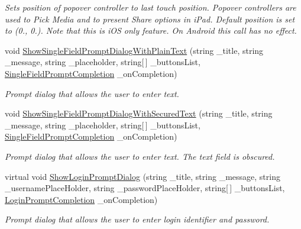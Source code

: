 \begin{DoxyCompactItemize}
\begin{DoxyCompactList}\small\item\em Sets position of popover controller to last touch position. Popover controllers are used to Pick Media and to present Share options in i\+Pad. Default position is set to (0., 0.). Note that this is i\+O\+S only feature. On Android this call has no effect. \end{DoxyCompactList}\item 
void \hyperlink{class_voxel_busters_1_1_native_plugins_1_1_u_i_ad78010ddfdb7303a095989f561dd895f}{Show\+Single\+Field\+Prompt\+Dialog\+With\+Plain\+Text} (string \+\_\+title, string \+\_\+message, string \+\_\+placeholder, string\mbox{[}$\,$\mbox{]} \+\_\+buttons\+List, \hyperlink{class_voxel_busters_1_1_native_plugins_1_1_u_i_ab0a0d009b7dbdc669cedc932da72e0ea}{Single\+Field\+Prompt\+Completion} \+\_\+on\+Completion)
\begin{DoxyCompactList}\small\item\em Prompt dialog that allows the user to enter text. \end{DoxyCompactList}\item 
void \hyperlink{class_voxel_busters_1_1_native_plugins_1_1_u_i_ad8376c30acf9b24dc8c4209a8b093b36}{Show\+Single\+Field\+Prompt\+Dialog\+With\+Secured\+Text} (string \+\_\+title, string \+\_\+message, string \+\_\+placeholder, string\mbox{[}$\,$\mbox{]} \+\_\+buttons\+List, \hyperlink{class_voxel_busters_1_1_native_plugins_1_1_u_i_ab0a0d009b7dbdc669cedc932da72e0ea}{Single\+Field\+Prompt\+Completion} \+\_\+on\+Completion)
\begin{DoxyCompactList}\small\item\em Prompt dialog that allows the user to enter text. The text field is obscured. \end{DoxyCompactList}\item 
virtual void \hyperlink{class_voxel_busters_1_1_native_plugins_1_1_u_i_abfc8e5d3fc0d3a42a8e04112c90c98e5}{Show\+Login\+Prompt\+Dialog} (string \+\_\+title, string \+\_\+message, string \+\_\+username\+Place\+Holder, string \+\_\+password\+Place\+Holder, string\mbox{[}$\,$\mbox{]} \+\_\+buttons\+List, \hyperlink{class_voxel_busters_1_1_native_plugins_1_1_u_i_a8f84064901adeb069478fb7946e5f573}{Login\+Prompt\+Completion} \+\_\+on\+Completion)
\begin{DoxyCompactList}\small\item\em Prompt dialog that allows the user to enter login identifier and password. \end{DoxyCompactList}\item 

\end{DoxyCompactItemize}
